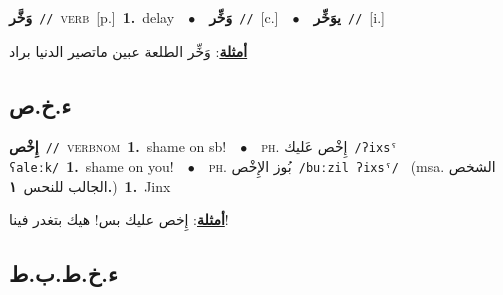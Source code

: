 \documentclass[10pt,a4paper,twoside]{article} %
\begin{document}
\begin{multicols}{2}
{\setlength\topsep{0pt}\textbf{\foreignlanguage{arabic}{وَخَّر}}\ {\color{gray}\texttt{//}\color{black}}\ \textsc{verb}\ [p.]\ \textbf{1.}~delay\ \ $\bullet$\ \ \setlength\topsep{0pt}\textbf{\foreignlanguage{arabic}{وَخِّر}}\ {\color{gray}\texttt{//}\color{black}}\ [c.]\ \ $\bullet$\ \ \setlength\topsep{0pt}\textbf{\foreignlanguage{arabic}{يوَخِّر}}\ {\color{gray}\texttt{//}\color{black}}\ [i.]\  \begin{flushright}\color{gray}\foreignlanguage{arabic}{\textbf{\underline{\foreignlanguage{arabic}{أمثلة}}}: وَخِّر الطلعة عبين ماتصير الدنيا براد}\end{flushright}\color{black}} \vspace{2mm}

\vspace{-3mm}
\subsection*{\color{blue}\foreignlanguage{arabic}{ء.خ.ص}\color{blue}{ (ntws)}} 

{\setlength\topsep{0pt}\textbf{\foreignlanguage{arabic}{إِخْص}}\ {\color{gray}\texttt{//}\color{black}}\ \textsc{verb\textunderscore nom}\ \textbf{1.}~shame on sb!\ \ $\bullet$\ \ \textsc{ph.} \color{gray} \foreignlanguage{arabic}{إِخْص عَليك}\color{black}\ {\color{gray}\texttt{/{\sffamily ʔixsˤ ʕaleːk}/}\color{black}}\ \textbf{1.}~shame on you!\ \ $\bullet$\ \ \textsc{ph.} \color{gray} \foreignlanguage{arabic}{بُوز الإِخْص}\color{black}\ {\color{gray}\texttt{/{\sffamily buːzil ʔixsˤ}/}\color{black}}\ \color{gray} (msa. \foreignlanguage{arabic}{الشخص الجالب للنحس}~\foreignlanguage{arabic}{\textbf{١.}})\color{black}\ \textbf{1.}~Jinx\  \begin{flushright}\color{gray}\foreignlanguage{arabic}{\textbf{\underline{\foreignlanguage{arabic}{أمثلة}}}: إِخص عليك بس! هيك بتغدر فينا!}\end{flushright}\color{black}} \vspace{2mm}

\vspace{-3mm}
\subsection*{\color{blue}\foreignlanguage{arabic}{ء.خ.ط.ب.ط}\color{blue}{ (ntws)}} 


\end{multicols}
\end{document}

